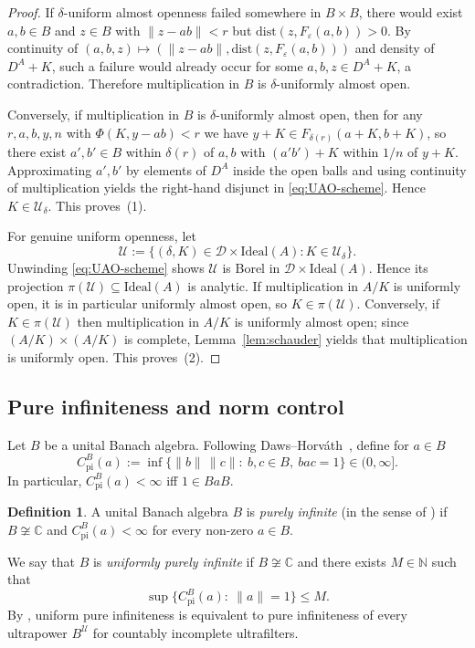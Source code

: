 \documentclass[12pt,fleqn,a4paper]{amsart}
\renewcommand{\le}{\leqslant}
\numberwithin{equation}{section}
\theoremstyle{definition}
\newtheorem{definition}[theorem]{Definition}
\newcommand{\N}{\mathbb{N}}
\newcommand{\C}{\mathbb{C}}
\newcommand{\Ideal}{\mathrm{Ideal}}
\newcommand{\dist}{\mathrm{dist}}
\begin{document}
\begin{proof}
If $\delta$-uniform almost openness failed somewhere in $B\times B$, there would exist
$a,b\in B$ and $z\in B$ with $\|z-ab\|<r$ but $\dist(z,F_\varepsilon(a,b))>0$.
By continuity of $(a,b,z)\mapsto (\|z-ab\|,\dist(z,F_\varepsilon(a,b)))$ and density of
$D^A+K$, such a failure would already occur for some $a,b,z\in D^A+K$, a contradiction.
Therefore multiplication in $B$ is $\delta$-uniformly almost open.

Conversely, if multiplication in $B$ is $\delta$-uniformly almost open, then for any
$r,a,b,y,n$ with $\Phi(K,y-ab)<r$ we have $y+K\in F_{\delta(r)}(a+K,b+K)$, so there exist
$a',b'\in B$ within $\delta(r)$ of $a,b$ with $(a'b')+K$ within $1/n$ of $y+K$.
Approximating $a',b'$ by elements of $D^A$ inside the open balls and using continuity of
multiplication yields the right-hand disjunct in \eqref{eq:UAO-scheme}. Hence
$K\in\mathcal U_\delta$.
This proves~(1).

For genuine uniform openness, let
\[
\mathcal U:=\bigl\{(\delta,K)\in\mathcal D\times\Ideal(A):
K\in\mathcal U_\delta\bigr\}.
\]
Unwinding \eqref{eq:UAO-scheme} shows $\mathcal U$ is Borel in $\mathcal D\times\Ideal(A)$.
Hence its projection $\pi(\mathcal U)\subseteq\Ideal(A)$ is analytic.
If multiplication in $A/K$ is uniformly open, it is in particular uniformly almost open, so
$K\in\pi(\mathcal U)$.
Conversely, if $K\in\pi(\mathcal U)$ then multiplication in $A/K$ is uniformly almost open;
since $(A/K)\times(A/K)$ is complete, Lemma~\ref{lem:schauder} yields that multiplication is
uniformly open.
This proves~(2).
\end{proof}

\subsection{Pure infiniteness and norm control}\label{subsec:PI}

Let $B$ be a unital Banach algebra.  Following Daws--Horv\'ath~\cite{DawsHorvath},
define for $a\in B$
\[
C_{\mathrm{pi}}^B(a):=\inf\{\|b\|\,\|c\|:\ b,c\in B,\ bac=1\}\in(0,\infty].
\]
In particular, $C_{\mathrm{pi}}^B(a)<\infty$ iff $1\in BaB$.

\begin{definition}\label{def:PI-unif}
A unital Banach algebra $B$ is \emph{purely infinite} (in the sense of
\cite{DawsHorvath}) if $B\not\cong\C$ and $C_{\mathrm{pi}}^B(a)<\infty$ for every
non-zero $a\in B$.

We say that $B$ is \emph{uniformly purely infinite} if $B\not\cong\C$ and there exists
$M\in\N$ such that
\[
\sup\{C_{\mathrm{pi}}^B(a):\ \|a\|=1\}\le M.
\]
By \cite[Prop.~2.2]{DawsHorvath}, uniform pure infiniteness is equivalent to pure
infiniteness of every ultrapower $B^{\mathcal U}$ for countably incomplete ultrafilters.
\end{definition}
\end{document}
